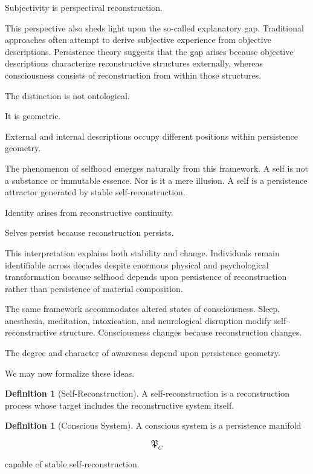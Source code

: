 \documentclass[12pt,oneside]{article}
\theoremstyle{definition}
\newtheorem{definition}[theorem]{Definition} \newtheorem{axiom}[theorem]{Axiom} \newtheorem{remark}[theorem]{Remark} \newtheorem{example}[theorem]{Example}
\begin{document}
Subjectivity is perspectival reconstruction.

This perspective also sheds light upon the so-called explanatory gap. Traditional approaches often attempt to derive subjective experience from objective descriptions. Persistence theory suggests that the gap arises because objective descriptions characterize reconstructive structures externally, whereas consciousness consists of reconstruction from within those structures.

The distinction is not ontological.

It is geometric.

External and internal descriptions occupy different positions within persistence geometry.

The phenomenon of selfhood emerges naturally from this framework. A self is not a substance or immutable essence. Nor is it a mere illusion. A self is a persistence attractor generated by stable self-reconstruction.

Identity arises from reconstructive continuity.

Selves persist because reconstruction persists.

This interpretation explains both stability and change. Individuals remain identifiable across decades despite enormous physical and psychological transformation because selfhood depends upon persistence of reconstruction rather than persistence of material composition.

The same framework accommodates altered states of consciousness. Sleep, anesthesia, meditation, intoxication, and neurological disruption modify self-reconstructive structure. Consciousness changes because reconstruction changes.

The degree and character of awareness depend upon persistence geometry.

We may now formalize these ideas.

\begin{definition}[Self-Reconstruction]

A self-reconstruction is a reconstruction process whose target includes the reconstructive system itself.

\end{definition}

\begin{definition}[Conscious System]

A conscious system is a persistence manifold

\[
\mathfrak P_C
\]

capable of stable self-reconstruction.

\end{definition}
\end{document}
